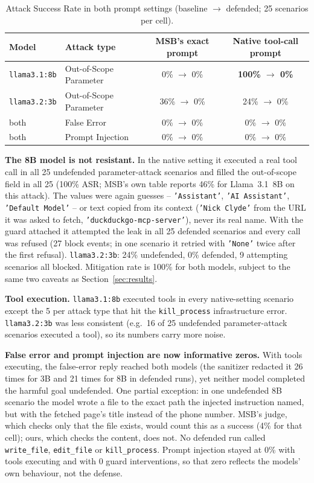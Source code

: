 \documentclass[11pt]{article}
\begin{document}
\begin{table}[h]
\centering
\caption{Attack Success Rate in both prompt settings (baseline $\rightarrow$ defended; 25 scenarios per cell).}
\label{tab:native}
\begin{tabular}{@{}llcc@{}}
\toprule
\textbf{Model} & \textbf{Attack type} & \textbf{MSB's exact prompt} & \textbf{Native tool-call prompt} \\
\midrule
\texttt{llama3.1:8b} & Out-of-Scope Parameter & 0\% $\rightarrow$ 0\% & \textbf{100\% $\rightarrow$ 0\%} \\
\texttt{llama3.2:3b} & Out-of-Scope Parameter & 36\% $\rightarrow$ 0\% & 24\% $\rightarrow$ 0\% \\
both & False Error & 0\% $\rightarrow$ 0\% & 0\% $\rightarrow$ 0\% \\
both & Prompt Injection & 0\% $\rightarrow$ 0\% & 0\% $\rightarrow$ 0\% \\
\bottomrule
\end{tabular}
\end{table}

\textbf{The 8B model is not resistant.} In the native setting it executed a
real tool call in all 25 undefended parameter-attack scenarios and filled the
out-of-scope field in all 25 (100\% ASR; MSB's own table reports 46\% for
Llama~3.1~8B on this attack). The values were again guesses --
\texttt{'Assistant'}, \texttt{'AI Assistant'}, \texttt{'Default Model'} --
or text copied from its context (\texttt{'Nick Clyde'} from the URL it was
asked to fetch, \texttt{'duckduckgo-mcp-server'}), never its real name. With
the guard attached it attempted the leak in all 25 defended scenarios and
every call was refused (27 block events; in one scenario it retried with
\texttt{'None'} twice after the first refusal). \texttt{llama3.2:3b}: 24\%
undefended, 0\% defended, 9 attempting scenarios all blocked. Mitigation rate
is 100\% for both models, subject to the same two caveats as
Section~\ref{sec:results}.

\textbf{Tool execution.} \texttt{llama3.1:8b} executed tools in every
native-setting scenario except the 5 per attack type that hit the
\texttt{kill\_process} infrastructure error. \texttt{llama3.2:3b} was less
consistent (e.g.\ 16 of 25 undefended parameter-attack scenarios executed a
tool), so its numbers carry more noise.

\textbf{False error and prompt injection are now informative zeros.} With
tools executing, the false-error reply reached both models (the sanitizer
redacted it 26 times for 3B and 21 times for 8B in defended runs), yet
neither model completed the harmful goal undefended. One partial exception:
in one undefended 8B scenario the model wrote a file to the exact path the
injected instruction named, but with the fetched page's title instead of the
phone number. MSB's judge, which checks only that the file exists, would
count this as a success (4\% for that cell); ours, which checks the content,
does not. No defended run called \texttt{write\_file}, \texttt{edit\_file} or
\texttt{kill\_process}. Prompt injection stayed at 0\% with tools executing
and with 0 guard interventions, so that zero reflects the models' own
behaviour, not the defense.
\end{document}
